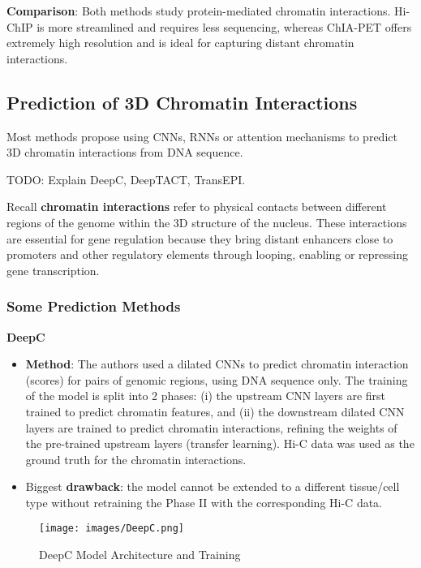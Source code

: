 \documentclass[a4paper]{article}
\begin{document}
\noindent \textbf{Comparison}: 
Both methods study protein-mediated chromatin interactions. 
Hi-ChIP is more streamlined and requires less sequencing, whereas ChIA-PET 
offers extremely high resolution and is ideal for capturing distant chromatin 
interactions.

\subsection*{Prediction of 3D Chromatin Interactions}

Most methods propose using CNNs, RNNs or attention mechanisms to predict 3D
chromatin interactions from DNA sequence.

TODO: Explain DeepC, DeepTACT, TransEPI.

Recall \textbf{chromatin interactions} refer to physical contacts 
between different regions of the genome within the 3D structure of the nucleus. 
These interactions are essential for gene regulation because they bring 
distant enhancers close to promoters and other regulatory elements through 
looping, enabling or repressing gene transcription.

\subsubsection*{Some Prediction Methods}

\textbf{DeepC}

\begin{itemize}
  \item \textbf{Method}: The authors used a dilated CNNs to predict
  chromatin interaction (scores) for pairs of genomic regions, using DNA sequence
  only. The training of the model is split into 2 phases: (i) the upstream CNN
  layers are first trained to predict chromatin features, and (ii) the downstream
  dilated CNN layers are trained to predict chromatin interactions, refining the
  weights of the pre-trained upstream layers (transfer learning). Hi-C data was used
  as the ground truth for the chromatin interactions. 
  
  \item Biggest \textbf{drawback}: the model cannot be extended to a different tissue/cell type without
  retraining the Phase II with the corresponding Hi-C data.
\end{itemize}

\begin{figure}
  \centering
  \texttt{[image: images/DeepC.png]}
  \caption{DeepC Model Architecture and Training}
\end{figure}
\end{document}
